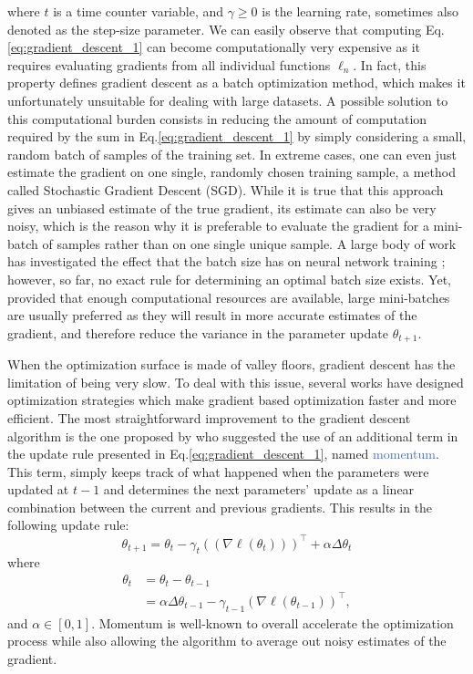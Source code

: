 where $t$ is a time counter variable, and $\gamma\geq0$ is the learning rate, sometimes also denoted as the step-size parameter. We can easily observe that computing Eq. \ref{eq:gradient_descent_1} can become computationally very expensive as it requires evaluating gradients from all individual functions $\ell_n$. In fact, this property defines gradient descent as a batch optimization method, which makes it unfortunately unsuitable for dealing with large datasets. A possible solution to this computational burden consists in reducing the amount of computation required by the sum in Eq.\ref{eq:gradient_descent_1} by simply considering a small, random batch of samples of the training set. In extreme cases, one can even just estimate the gradient on one single, randomly chosen training sample, a method called Stochastic Gradient Descent (SGD). While it is true that this approach gives an unbiased estimate of the true gradient, its estimate can also be very noisy, which is the reason why it is preferable to evaluate the gradient for a mini-batch of samples rather than on one single unique sample. A large body of work has investigated the effect that the batch size has on neural network training \cite{keskar2016large,radiuk2017impact,kandel2020effect}; however, so far, no exact rule for determining an optimal batch size exists. Yet, provided that enough computational resources are available, large mini-batches are usually preferred as they will result in more accurate estimates of the gradient, and therefore reduce the variance in the parameter update $\theta_{t+1}$. 

When the optimization surface is made of valley floors, gradient descent has the limitation of being very slow. To deal with this issue, several works have designed optimization strategies which make gradient based optimization faster and more efficient. The most straightforward improvement to the gradient descent algorithm is the one proposed by \citet{rumelhart1986learning} who suggested the use of an additional term in the update rule presented in Eq.\ref{eq:gradient_descent_1}, named \textcolor{RoyalBlue}{momentum}. This term, simply keeps track of what happened when the parameters were updated at $t-1$ and determines the next parameters' update as a linear combination between the current and previous gradients. This results in the following update rule:
\begin{equation}
	\theta_{t+1} = \theta_t - \gamma_t ((\nabla \ell(\theta_t)))^{\intercal} + \alpha\Delta\theta_t
	\label{eq: momentum}
\end{equation}
where  
\begin{equation}
	\begin{split}
	\theta_{t} & = \theta_t - \theta_{t-1} \\ 
		   & = \alpha\Delta\theta_{t-1}-\gamma_{t-1}(\nabla \ell(\theta_{t-1}))^{\intercal},
	\end{split}
\label{eq:gradient_descent}
\end{equation}
and $\alpha\in[0,1]$. Momentum is well-known to overall accelerate the optimization process while also allowing the algorithm to average out noisy estimates of the gradient.

